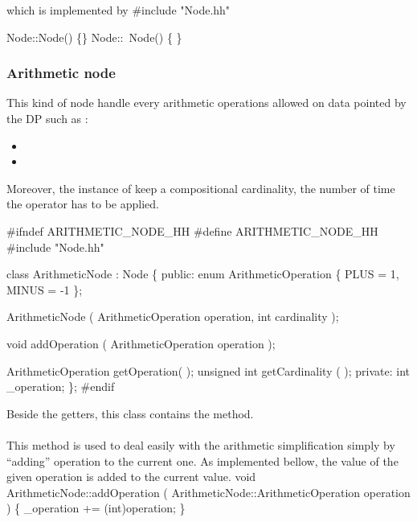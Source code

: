 which is implemented by
\nwenddocs{}\endmoddef\nwstartdeflinemarkup\nwenddeflinemarkup
#include "Node.hh"

Node::Node() \{\}
Node::~Node() \{ \}
\nwendcode{}\nwdocspar

\subsubsection{Arithmetic node}
This kind of node handle every arithmetic operations allowed on data pointed by the \gls{DP} such as :
\begin{itemize}
        \item {}
        \item {}
\end{itemize}

Moreover, the instance of  keep a compositional cardinality, \ie the number of time the operator has to be applied.


\nwenddocs{}\endmoddef\nwstartdeflinemarkup\nwenddeflinemarkup
#ifndef ARITHMETIC_NODE_HH
#define ARITHMETIC_NODE_HH
#include "Node.hh"


class ArithmeticNode : Node \{
        public:
                enum ArithmeticOperation \{ 
                        PLUS    = 1,
                        MINUS   = -1
                \};

                ArithmeticNode ( ArithmeticOperation operation, int cardinality );
                
                void addOperation ( ArithmeticOperation operation );

                ArithmeticOperation getOperation( );
                unsigned int getCardinality ( );
        private:
                int _operation;
\};
#endif
\nwendcode{}\nwdocspar

Beside the getters, this class contains the  method.

\paragraph{}
This method is used to deal easily with the arithmetic simplification simply by ``adding'' operation to the current one. As implemented bellow, the value of the given operation is added to the current value.
\nwenddocs{}\endmoddef\nwstartdeflinemarkup\nwenddeflinemarkup
void ArithmeticNode::addOperation ( ArithmeticNode::ArithmeticOperation operation ) \{
        _operation += (int)operation;
\}
\nwendcode{}\nwdocspar

